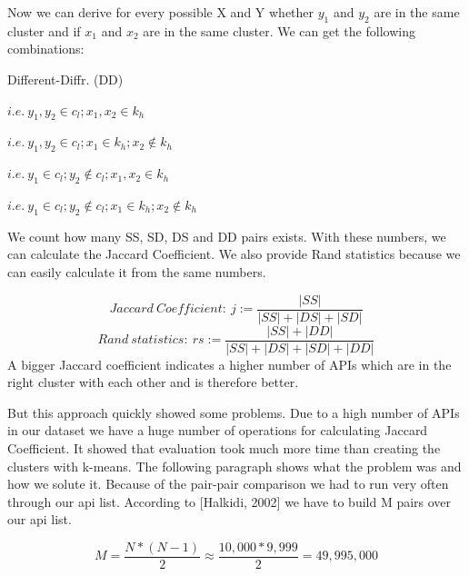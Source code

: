 \documentclass[a4paper]{IEEEtran}
\begin{document}
Now we can derive for every possible X and Y whether $y_1$  and $y_2$ are in the same cluster and if $x_1$  and $x_2$ are in the same cluster. We can get the following combinations: \\
\begin{labeling}{Different-Diffr. (DD)}
\item [Same-same (SS)]  $i.e.~y_1,y_2 \in c_l; x_1,x_2 \in k_h$ \\
\item [Same-Different (SD)]  $i.e.~ y_1,y_2 \in c_l; x_1 \in k_h; x_2 \notin k_h$ \\
\item [Different-Same (DS)]  $i.e.~ y_1 \in c_l; y_2 \notin c_l; x_1,x_2 \in k_h$ \\
\item [Different-Diffr. (DD)]  $i.e.~y_1 \in c_l; y_2 \notin c_l; x_1 \in k_h;x_2 \notin k_h$
\end{labeling}

We count how many SS, SD, DS and DD pairs exists. With these numbers, we can calculate the Jaccard Coefficient. We also provide Rand statistics because we can easily calculate it from the same numbers.

\begin{equation*}
Jaccard~Coefficient:~ j:= \frac{|SS|}{|SS|+|DS|+|SD|}
\end{equation*}
\begin{equation*}
Rand~statistics:~ rs:= \frac{|SS|+|DD|}{|SS|+|DS|+|SD|+|DD|}
\end{equation*}
A bigger Jaccard coefficient indicates a higher number of APIs which are in the right cluster with each other and is therefore better.

But this approach quickly showed some problems. Due to a high number of APIs in our dataset we have a huge number of operations for calculating Jaccard Coefficient. It showed that evaluation took much more time than creating the clusters with k-means. The following paragraph shows what the problem was and how we solute it.
Because of the pair-pair comparison we had to run very often through our api list. According to [Halkidi, 2002] we have to build M pairs over our api list.

\begin{equation*}
M= \frac{N*(N-1)}{2}\approx \frac{10,000*9,999}{2}=49,995,000
\end{equation*}
\end{document}
